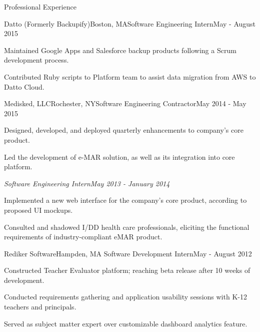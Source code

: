 \documentclass{resume} %
\begin{document}
\begin{rSection}{Professional Experience}

\begin{rSubsection}{Datto (Formerly Backupify)}{Boston, MA}{Software Engineering Intern}{May - August 2015}
\item Maintained Google Apps and Salesforce backup products following a Scrum development process.
\item Contributed Ruby scripts to Platform team to assist data migration from AWS to Datto Cloud. 
\end{rSubsection}


\begin{rSubsection}{Medisked, LLC}{Rochester, NY}{Software Engineering Contractor}{May 2014 - May 2015}
\item Designed, developed, and deployed quarterly enhancements to company's core product.
\item Led the development of e-MAR solution, as well as its integration into core platform.

{\sl Software Engineering Intern}\hfill{\sl May 2013 - January 2014}
\item Implemented a new web interface for the company's core product, according to proposed UI mockups.
\item Consulted and shadowed I/DD health care professionals, eliciting the functional 	requirements of industry-compliant eMAR product.   
\end{rSubsection}


\begin{rSubsection}{Rediker Software}{Hampden, MA}
{Software Development Intern}{May - August 2012}
\item Constructed Teacher Evaluator platform; reaching beta release after 10 weeks of development.
\item Conducted requirements gathering and application usability sessions with K-12 teachers and principals.
\item Served as subject matter expert over customizable dashboard analytics feature.
\end{rSubsection}

\end{rSection}
\end{document}
